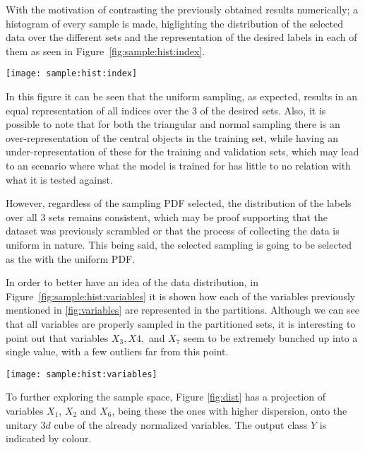 \documentclass[journal]{IEEEtran}
\begin{document}
With the motivation of contrasting the previously obtained results numerically;
a histogram of every sample is made, higlighting the distribution of the
selected data over the different sets and the representation of the desired
labels in each of them as seen in Figure~\ref{fig:sample:hist:index}.

\begin{figure*}[ht]
    \texttt{[image: sample:hist:index]}
    \caption{Example of a figure caption. \label{fig:sample:hist:index}}
\end{figure*}

In this figure it can be seen that the uniform sampling, as expected, results in
an equal representation of all indices over the $3$ of the desired sets. Also,
it is possible to note that for both the triangular and normal sampling there is
an over-representation of the central objects in the training set, while having
an under-representation of these for the training and validation sets, which may
lead to an scenario where what the model is trained for has little to no
relation with what it is tested against.

However, regardless of the sampling PDF selected, the distribution of the labels
over all $3$ sets remains consistent, which may be proof supporting that the
dataset was previously scrambled or that the process of collecting the data is
uniform in nature. This being said, the selected sampling is going to be
selected as the with the uniform PDF.

In order to better have an idea of the data distribution, in
Figure~\ref{fig:sample:hist:variables} it is shown how each of the variables
previously mentioned in \ref{fig:variables} are represented in the partitions.
Although we can see that all variables are properly sampled in the partitioned
sets, it is interesting to point out that variables $X_3, X4,$ and $X_7$ seem to
be extremely bunched up into a single value, with a few outliers far from this
point. 

\begin{figure*}[ht]
    \texttt{[image: sample:hist:variables]}
    \caption{Example of a figure caption. \label{fig:sample:hist:variables}}
\end{figure*}

To further exploring the sample space, Figure \ref{fig:dist} has a projection of
variables $X_1$, $X_2$ and $X_6$, being these the ones with higher dispersion,
onto the unitary $3d$ cube of the already normalized variables. The output class
$Y$ is indicated by colour. 
\end{document}
